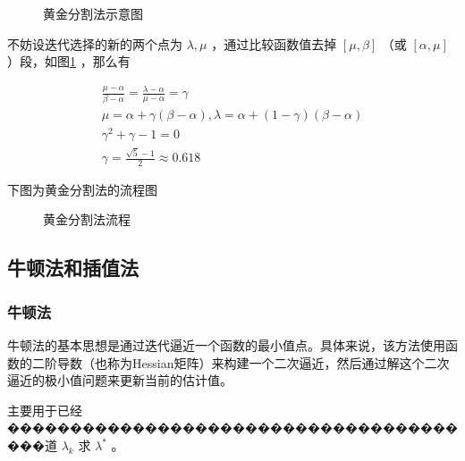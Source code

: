 \documentclass{book}
\begin{document}
\begin{figure}[ht]
    \centering
    \caption{黄金分割法示意图}
    \label{fig:Golden section method}
\end{figure}

不妨设迭代选择的新的两个点为 $\lambda,\mu$ ，通过比较函数值去掉 $[\mu,\beta]$ （或 $[\alpha,\mu]$ ）段，如图\ref{fig:Golden section method} ，那么有

\begin{gather*}
    \frac{\mu-\alpha}{\beta-\alpha}=\frac{\lambda-\alpha}{\mu-\alpha}=\gamma       \\
    \mu=\alpha+\gamma(\beta-\alpha),\lambda=\alpha+(1-\gamma)(\beta-\alpha) \\
    \gamma^2+\gamma-1 =0                                       \\
    \gamma=\frac{\sqrt{5}-1}{2}\approx0.618
\end{gather*}

下图为黄金分割法的流程图

\begin{figure}[ht]
    \centering
    
    \caption{黄金分割法流程}
    \label{fig:flow of Golden section method}
\end{figure}

\subsection{牛顿法和插值法}

\subsubsection{牛顿法}

牛顿法的基本思想是通过迭代逼近一个函数的最小值点。具体来说，该方法使用函数的二阶导数（也称为Hessian矩阵）来构建一个二次逼近，然后通过解这个二次逼近的极小值问题来更新当前的估计值。

主要用于已经���������������������������������������道 $\lambda_k$ 求 $\lambda^*$ 。
\end{document}
